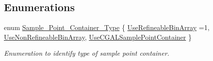 \subsection*{Enumerations}
\begin{DoxyCompactItemize}
\item 
enum \hyperlink{namespaceoomph_a8c0fdc9bd9751811cd49fe6f06c55991}{Sample\+\_\+\+Point\+\_\+\+Container\+\_\+\+Type} \{ \hyperlink{namespaceoomph_a8c0fdc9bd9751811cd49fe6f06c55991a6bd4eede6af4e6e7881a96e4dc0e34cd}{Use\+Refineable\+Bin\+Array} =1, 
\hyperlink{namespaceoomph_a8c0fdc9bd9751811cd49fe6f06c55991ae9f4b2ff7655b9f053dd855d15d929af}{Use\+Non\+Refineable\+Bin\+Array}, 
\hyperlink{namespaceoomph_a8c0fdc9bd9751811cd49fe6f06c55991a75595ef05f43add7443737e4fe76cd61}{Use\+C\+G\+A\+L\+Sample\+Point\+Container}
 \}\begin{DoxyCompactList}\small\item\em Enumeration to identify type of sample point container. \end{DoxyCompactList}
\end{DoxyCompactItemize}
